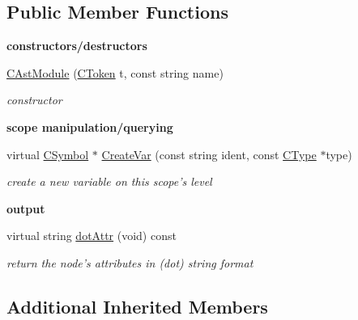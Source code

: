 \subsection*{Public Member Functions}
\begin{Indent}{\bf constructors/destructors}\par
\begin{DoxyCompactItemize}
\item 
\hyperlink{classCAstModule_acdff3d9935d9f0dad40e68f6bf1782c7}{C\-Ast\-Module} (\hyperlink{classCToken}{C\-Token} t, const string name)
\begin{DoxyCompactList}\small\item\em constructor \end{DoxyCompactList}\end{DoxyCompactItemize}
\end{Indent}
\begin{Indent}{\bf scope manipulation/querying}\par
\begin{DoxyCompactItemize}
\item 
\hypertarget{classCAstModule_a8f4d7f634427b4c4c8e88c45e784611a}{virtual \hyperlink{classCSymbol}{C\-Symbol} $\ast$ \hyperlink{classCAstModule_a8f4d7f634427b4c4c8e88c45e784611a}{Create\-Var} (const string ident, const \hyperlink{classCType}{C\-Type} $\ast$type)}\label{classCAstModule_a8f4d7f634427b4c4c8e88c45e784611a}

\begin{DoxyCompactList}\small\item\em create a new variable on this scope's level \end{DoxyCompactList}\end{DoxyCompactItemize}
\end{Indent}
\begin{Indent}{\bf output}\par
\begin{DoxyCompactItemize}
\item 
virtual string \hyperlink{classCAstModule_a93e95fb6bf13f032e3d8645c46db71c9}{dot\-Attr} (void) const 
\begin{DoxyCompactList}\small\item\em return the node's attributes in (dot) string format \end{DoxyCompactList}\end{DoxyCompactItemize}
\end{Indent}
\subsection*{Additional Inherited Members}


